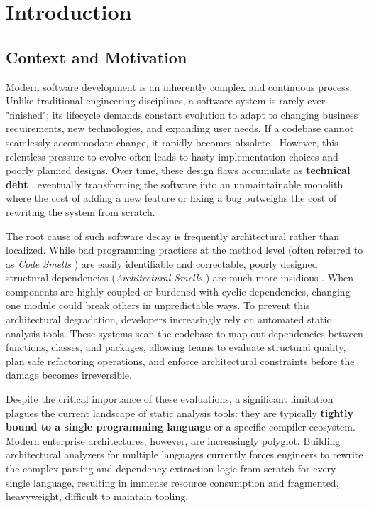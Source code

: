 \chapter{Introduction}
\label{ch:introduction}

\section{Context and Motivation}
Modern software development is an inherently complex and continuous
process. Unlike traditional engineering disciplines, a software
system is rarely ever "finished"; its lifecycle demands constant
evolution to adapt to changing business requirements, new
technologies, and expanding user needs. If a codebase cannot
seamlessly accommodate change, it rapidly becomes obsolete
\cite{lehman_programs_1980}. However,
this relentless pressure to evolve often leads to hasty
implementation choices and poorly planned designs. Over time, these
design flaws accumulate as \textbf{technical debt}
\cite{cunningham_wycash_1992},\cite{kruchten_technical_2012}
eventually transforming the
software into an unmaintainable monolith where the cost of adding a
new feature or fixing a bug outweighs the cost of rewriting the
system from scratch.

The root cause of such software decay is frequently architectural
rather than localized. While bad programming practices at the method
level (often referred to as \textit{Code Smells}
\cite{fowler_refactoring_2013}) are easily identifiable and
correctable, poorly designed structural dependencies
(\textit{Architectural Smells}
\cite{garcia_identifying_2009}) are much more insidious
\cite{arcelli_fontana_automatic_2012}.
When components are highly coupled or burdened with cyclic
dependencies, changing one module could break others in
unpredictable ways. To prevent this architectural degradation,
developers increasingly rely on automated static analysis tools.
These systems scan the codebase to map out dependencies between
functions, classes, and packages, allowing teams to evaluate
structural quality, plan safe refactoring operations, and enforce
architectural constraints before the damage becomes irreversible.

Despite the critical importance of these evaluations, a significant
limitation plagues the current landscape of static analysis tools:
they are typically \textbf{tightly bound to a single programming language} or
a specific compiler ecosystem. Modern enterprise architectures,
however, are increasingly polyglot.
Building architectural analyzers for multiple languages currently
forces engineers to rewrite the complex parsing and dependency
extraction logic from scratch for every single language, resulting in
immense resource consumption and fragmented, heavyweight, difficult
to maintain tooling.

